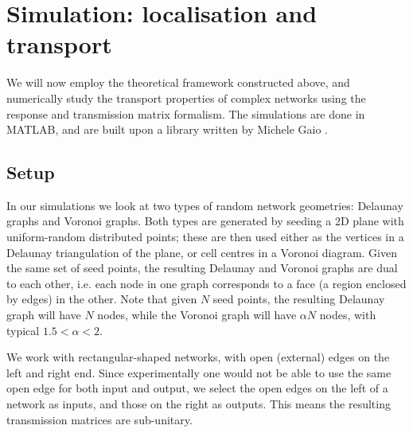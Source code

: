 \chapter{Simulation: localisation and transport}

We will now employ the theoretical framework constructed above, and numerically study the transport properties of complex networks using the response and transmission matrix formalism. The simulations are done in MATLAB, and are built upon a library written by Michele Gaio \cite{Gaio2017}. 

\section{Setup}
In our simulations we look at two types of random network geometries: Delaunay graphs and Voronoi graphs. Both types are generated by seeding a 2D plane with uniform-random distributed points; these are then used either as the vertices in a Delaunay triangulation of the plane, or cell centres in a Voronoi diagram. Given the same set of seed points, the resulting Delaunay and Voronoi graphs are dual to each other, i.e. each node in one graph corresponds to a face (a region enclosed by edges) in the other. Note that given $N$ seed points, the resulting Delaunay graph will have $N$ nodes, while the Voronoi graph will have $\alpha N$ nodes, with typical $1.5<\alpha<2$.


We work with rectangular-shaped networks, with open (external) edges on the left and right end. Since experimentally one would not be able to use the same open edge for both input and output, we select the open edges on the left of a network as inputs, and those on the right as outputs. This means the resulting transmission matrices are sub-unitary. 

